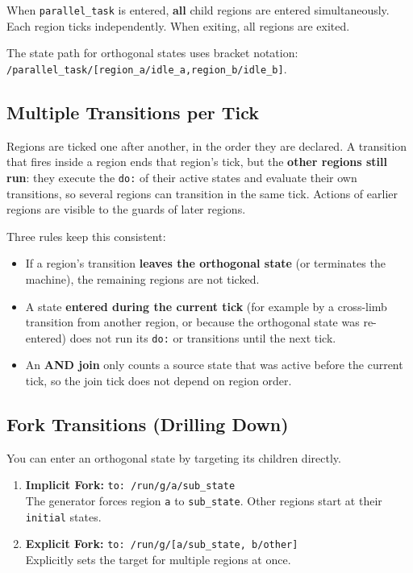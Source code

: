 \documentclass[a4paper,11pt]{article}
\begin{document}
When \texttt{parallel\_task} is entered, \textbf{all} child regions are entered simultaneously. Each region ticks independently. When exiting, all regions are exited.

The state path for orthogonal states uses bracket notation: \texttt{/parallel\_task/[region\_a/idle\_a,region\_b/idle\_b]}.

\subsection{Multiple Transitions per Tick}
Regions are ticked one after another, in the order they are declared. A transition that fires inside a region ends that region's tick, but the \textbf{other regions still run}: they execute the \texttt{do:} of their active states and evaluate their own transitions, so several regions can transition in the same tick. Actions of earlier regions are visible to the guards of later regions.

Three rules keep this consistent:
\begin{itemize}
    \item If a region's transition \textbf{leaves the orthogonal state} (or terminates the machine), the remaining regions are not ticked.
    \item A state \textbf{entered during the current tick} (for example by a cross-limb transition from another region, or because the orthogonal state was re-entered) does not run its \texttt{do:} or transitions until the next tick.
    \item An \textbf{AND join} only counts a source state that was active before the current tick, so the join tick does not depend on region order.
\end{itemize}

\subsection{Fork Transitions (Drilling Down)}
You can enter an orthogonal state by targeting its children directly.

\begin{enumerate}
    \item \textbf{Implicit Fork:} \texttt{to: /run/g/a/sub\_state} \\
    The generator forces region \texttt{a} to \texttt{sub\_state}. Other regions start at their \texttt{initial} states.
    \item \textbf{Explicit Fork:} \texttt{to: /run/g/[a/sub\_state, b/other]} \\
    Explicitly sets the target for multiple regions at once.
\end{enumerate}
\end{document}
